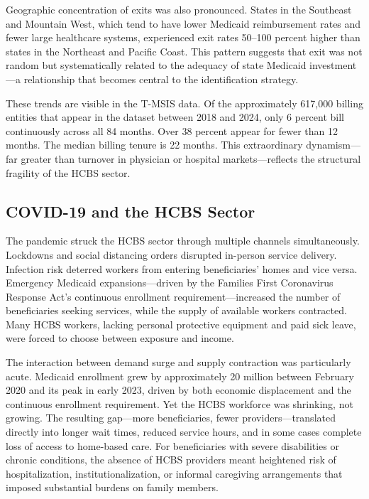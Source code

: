 \documentclass[12pt]{article}
\begin{document}
Geographic concentration of exits was also pronounced. States in the Southeast and Mountain West, which tend to have lower Medicaid reimbursement rates and fewer large healthcare systems, experienced exit rates 50--100 percent higher than states in the Northeast and Pacific Coast. This pattern suggests that exit was not random but systematically related to the adequacy of state Medicaid investment---a relationship that becomes central to the identification strategy.

These trends are visible in the T-MSIS data. Of the approximately 617,000 billing entities that appear in the dataset between 2018 and 2024, only 6 percent bill continuously across all 84 months. Over 38 percent appear for fewer than 12 months. The median billing tenure is 22 months. This extraordinary dynamism---far greater than turnover in physician or hospital markets---reflects the structural fragility of the HCBS sector.

\subsection{COVID-19 and the HCBS Sector}

The pandemic struck the HCBS sector through multiple channels simultaneously. Lockdowns and social distancing orders disrupted in-person service delivery. Infection risk deterred workers from entering beneficiaries' homes and vice versa. Emergency Medicaid expansions---driven by the Families First Coronavirus Response Act's continuous enrollment requirement---increased the number of beneficiaries seeking services, while the supply of available workers contracted. Many HCBS workers, lacking personal protective equipment and paid sick leave, were forced to choose between exposure and income.

The interaction between demand surge and supply contraction was particularly acute. Medicaid enrollment grew by approximately 20 million between February 2020 and its peak in early 2023, driven by both economic displacement and the continuous enrollment requirement. Yet the HCBS workforce was shrinking, not growing. The resulting gap---more beneficiaries, fewer providers---translated directly into longer wait times, reduced service hours, and in some cases complete loss of access to home-based care. For beneficiaries with severe disabilities or chronic conditions, the absence of HCBS providers meant heightened risk of hospitalization, institutionalization, or informal caregiving arrangements that imposed substantial burdens on family members.
\end{document}
